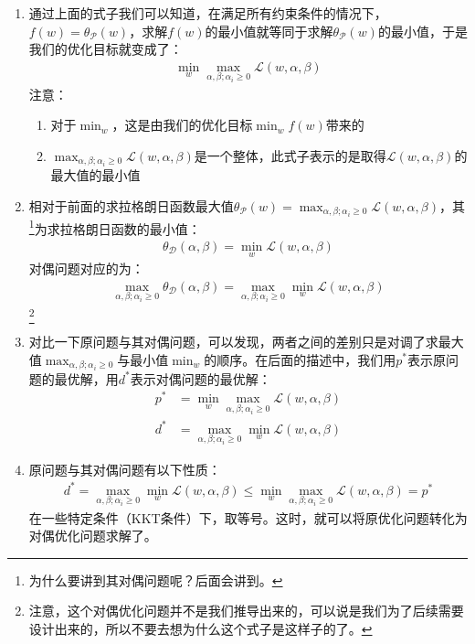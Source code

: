 \begin{enumerate}
	\item 通过上面的式子我们可以知道，在满足所有约束条件的情况下，$f(w)=\theta_{\mathcal{P}}(w)$，求解$f(w)$的最小值就等同于求解$\theta_{\mathcal{P}}(w)$的最小值，于是我们的优化目标就变成了：
	\begin{align}
		\min_{w} \max_{\alpha, \beta; \alpha_i \geq 0} \mathcal{L}(w, \alpha, \beta)
	\end{align}
	注意：
	\begin{enumerate}
		\item 对于$\min_{w}$，这是由我们的优化目标$\min_{w}f(w)$带来的
		\item $\max_{\alpha, \beta; \alpha_i \geq 0} \mathcal{L}(w, \alpha, \beta)$是一个整体，此式子表示的是取得$\mathcal{L}(w, \alpha, \beta)$的最大值的最小值
	\end{enumerate}

	\item 相对于前面的求拉格朗日函数最大值$\theta_{\mathcal{P}}(w) = \max_{\alpha, \beta; \alpha_i\geq0} \mathcal{L}(w, \alpha, \beta)$，其{\color{blue}{对偶问题}}\footnote{为什么要讲到其对偶问题呢？后面会讲到。}为求拉格朗日函数的最小值：
	\begin{align}
		\theta_{\mathcal{D}}(\alpha, \beta) = \min_{w} \mathcal{L}(w, \alpha, \beta)
	\end{align}
	对偶问题对应的{\color{blue}{对偶优化问题}}为：
	\begin{align}
		\max_{\alpha, \beta;\alpha_i \geq 0} \theta_{\mathcal{D}}(\alpha, \beta) = \max_{\alpha, \beta;\alpha_i \geq 0} \min_{w} \mathcal{L}(w, \alpha, \beta)
	\end{align}
	\footnote{注意，这个对偶优化问题并不是我们推导出来的，可以说是我们为了后续需要设计出来的，所以不要去想为什么这个式子是这样子的了。}

	\item 对比一下原问题与其对偶问题，可以发现，两者之间的差别只是对调了求最大值$\max_{\alpha, \beta;\alpha_i \geq 0}$与最小值$\min_{w}$的顺序。在后面的描述中，我们用$p^{*}$表示原问题的最优解，用$d^{*}$表示对偶问题的最优解：
	\begin{align}
		p^{*} &= \min_{w} \max_{\alpha, \beta; \alpha_i \geq 0} \mathcal{L}(w, \alpha, \beta) \\
		d^{*} &= \max_{\alpha, \beta;\alpha_i \geq 0} \min_{w} \mathcal{L}(w, \alpha, \beta)
	\end{align}

	\item 原问题与其对偶问题有以下性质：
	\begin{align}
		d^{*} = \max_{\alpha, \beta;\alpha_i \geq 0} \min_{w} \mathcal{L}(w, \alpha, \beta) \leq 
		\min_{w} \max_{\alpha, \beta; \alpha_i \geq 0} \mathcal{L}(w, \alpha, \beta) = p^{*}
	\end{align}
	在一些特定条件（KKT条件）下，取等号。这时，就可以将原优化问题转化为对偶优化问题求解了。


\end{enumerate}
